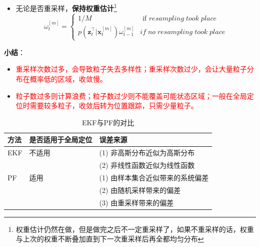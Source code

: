 \documentclass[../main.tex]{subfiles}
\begin{document}
\begin{enumerate}
\begin{itemize}
\begin{itemize}
                    \item 无论是否重采样，\textbf{保持权重估计}\footnote{权重估计仍然在做，但是做完之后不一定重采样了，如果不重采样的话，权重与上次的权重不断叠加直到下一次重采样后再全都均匀分布}
                    $$ {\omega }_{t}^{\left\lbrack  m\right\rbrack  } = \left\{  \begin{array}{ll} 1/M & \text{ if }{resampling}\;{took}\;{place} \\  p\left( {{\mathbf{z}}_{t}^{ \intercal  }|{\mathbf{x}}_{t}^{\left\lbrack  m\right\rbrack  }}\right) {\omega }_{t - 1}^{\left\lbrack  m\right\rbrack  } & {if}\;{no}\;{resampling}\;{took}\;{place} \end{array}\right. $$
                \end{itemize}
                \textbf{小结}：
                \begin{itemize}
                    \item \textcolor{red}{重采样次数过多，会导致粒子失去多样性；重采样次数过少，会让大量粒子分布在概率低的区域，收敛慢。}
                    \item \textcolor{red}{粒子数过多则计算浪费；粒子数过少则不能覆盖可能状态区域；一般在全局定位时需要较多粒子，收敛后转为位置跟踪，只需少量粒子。}
                \end{itemize}
            \begin{table}[H]
              \centering
              \caption{EKF与PF的对比}
              \label{tab:ekf_pf}
              \begin{tabular}{@{} l l p{9cm} @{}}
                \toprule
                方法 & 是否适用于全局定位 & 误差来源 \\
                \midrule
                EKF & 不适用 &
                  (1) 非高斯分布近似为高斯分布\\
                  & & (2) 非线性函数近似为线性函数 \\
                \addlinespace
                PF  & 适用 &
                  (1) 由样本集合近似带来的系统偏差\\
                  & & (2) 由随机采样带来的偏差\\
                  & & (3) 由重采样带来的偏差 \\
                \bottomrule
              \end{tabular}
            \end{table}
        \end{itemize}
            

\end{enumerate}
\end{document}
